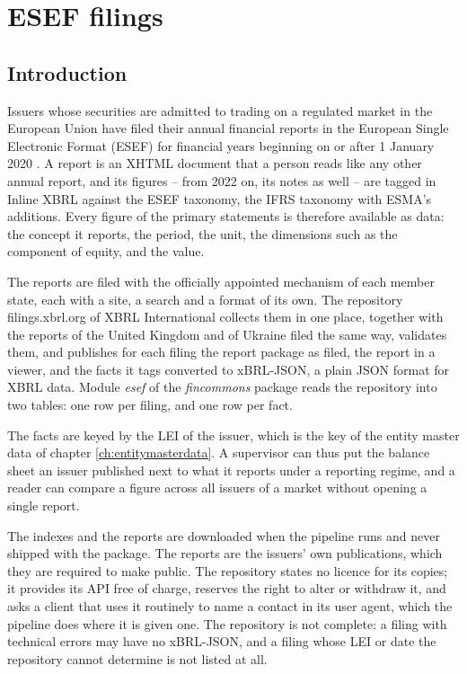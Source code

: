 \chapter{ESEF filings}\label{ch:esef}

\section{Introduction}

Issuers whose securities are admitted to trading on a regulated market in the European Union have filed their annual financial reports in the European Single Electronic Format (ESEF) for financial years beginning on or after 1 January 2020 \parencite{EU.2019}. A report is an XHTML document that a person reads like any other annual report, and its figures -- from 2022 on, its notes as well -- are tagged in Inline XBRL against the ESEF taxonomy, the IFRS taxonomy with ESMA's additions. Every figure of the primary statements is therefore available as data: the concept it reports, the period, the unit, the dimensions such as the component of equity, and the value.

The reports are filed with the officially appointed mechanism of each member state, each with a site, a search and a format of its own. The repository filings.xbrl.org of XBRL International \parencite{XBRL.2026} collects them in one place, together with the reports of the United Kingdom and of Ukraine filed the same way, validates them, and publishes for each filing the report package as filed, the report in a viewer, and the facts it tags converted to xBRL-JSON, a plain JSON format for XBRL data. Module \emph{esef} of the \emph{fincommons} package reads the repository into two tables: one row per filing, and one row per fact.

The facts are keyed by the LEI of the issuer, which is the key of the entity master data of chapter \ref{ch:entitymasterdata}. A supervisor can thus put the balance sheet an issuer published next to what it reports under a reporting regime, and a reader can compare a figure across all issuers of a market without opening a single report.

The indexes and the reports are downloaded when the pipeline runs and never shipped with the package. The reports are the issuers' own publications, which they are required to make public. The repository states no licence for its copies; it provides its API free of charge, reserves the right to alter or withdraw it, and asks a client that uses it routinely to name a contact in its user agent, which the pipeline does where it is given one. The repository is not complete: a filing with technical errors may have no xBRL-JSON, and a filing whose LEI or date the repository cannot determine is not listed at all.

